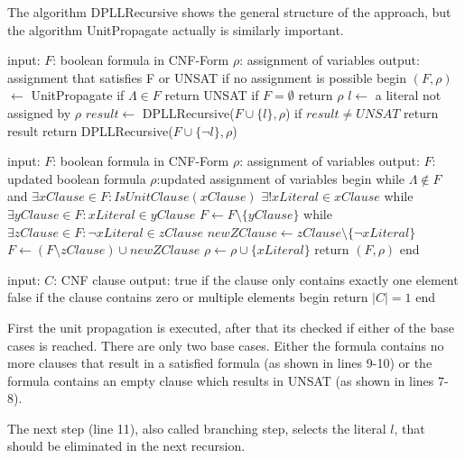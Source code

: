 The algorithm DPLLRecursive shows the general structure of the approach, but the algorithm UnitPropagate actually is similarly important.

\begin{algorithm}[caption={DPLLRecursive}, label={algDPLLRecursive}]
 input: $F$: boolean formula in CNF-Form
	$\rho$: assignment of variables
 output: assignment that satisfies F or 
	UNSAT if no assignment is possible
 begin
   $(F, \rho)$  $\gets$ UnitPropagate
   if $\Lambda \in F$
	return UNSAT
   if $F = \emptyset$
	return $\rho$
   $l \gets$ a literal not assigned by $\rho$
   $result \gets$ DPLLRecursive($F \cup \{l\}, \rho$)
   if $result \neq UNSAT$
	return result
   return DPLLRecursive($F \cup \{\lnot l\}, \rho$)
\end{algorithm}

\begin{adjustbox}{width=\columnwidth}
\begin{algorithm}[caption={UnitPropagate}, label={algUnitProgagate}]
 input: $F$: boolean formula in CNF-Form
	$\rho$: assignment of variables
 output: $F$: updated boolean formula
	$\rho$:updated assignment of variables
 begin
   while $\Lambda \notin F$ and $\exists xClause \in F: IsUnitClause(xClause)$
	$\exists! xLiteral \in xClause$
	while $\exists yClause \in F: xLiteral \in yClause$
		$F \gets F \setminus \{yClause\}$     
	while $\exists zClause \in F: \lnot xLiteral \in zClause$
		$newZClause \gets zClause \setminus \{\lnot xLiteral\}$
		$F \gets (F \setminus zClause) \cup newZClause$
	$\rho \gets \rho \cup \{xLiteral\}$
   return $(F, \rho)$
 end
\end{algorithm}
\end{adjustbox}
\begin{algorithm}[caption={IsUnitClause}, label={algIsUnitClause}]
 input: $C$: CNF clause
 output: true if the clause only contains
		exactly one element
	false if the clause contains zero 
		or multiple elements
 begin
   return $|C| = 1$
 end
\end{algorithm}

First the unit propagation is executed, after that its checked if either of the base cases is reached. 
There are only two base cases. Either the formula contains no more clauses that result in a satisfied formula (as shown in lines 9-10) or the formula contains an empty clause which results in UNSAT (as shown in lines 7-8).

The next step (line 11), also called branching step, selects the literal $l$, that should be eliminated in the next recursion.

